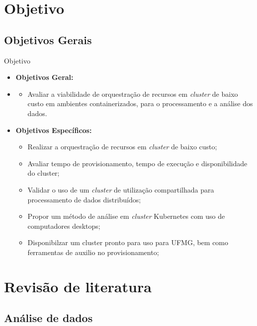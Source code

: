 \documentclass[10pt,brazil]{beamer}
\theoremstyle{definition}
\begin{document}
\section{Objetivo}
\subsection*{Objetivos Gerais}
\begin{frame}{Objetivo}
  \begin{itemize}
    \item[] \textbf{Objetivos Geral:}
    \item[]
      \begin{itemize}
        \item[] Avaliar a viabilidade de orquestração de recursos em \emph{cluster} de baixo custo em ambientes containerizados, para o processamento e a análise dos dados.
      \end{itemize}
    \item[] \textbf{Objetivos Específicos:}
      \begin{itemize}
        \item Realizar a orquestração de recursos em \emph{cluster} de baixo custo;
        \item Avaliar tempo de provisionamento, tempo de execução e disponibilidade do cluster;
        \item Validar o uso de um \emph{cluster} de utilização compartilhada para processamento de dados distribuídos;
        \item Propor um método de análise em \emph{cluster} Kubernetes com uso de computadores desktops;
        \item Disponibilzar um cluster pronto para uso para UFMG, bem como ferramentas de auxilio no provisionamento;
      \end{itemize}
  \end{itemize}
\end{frame}


\section{Revisão de literatura}

\subsection{Análise de dados}
\end{document}
